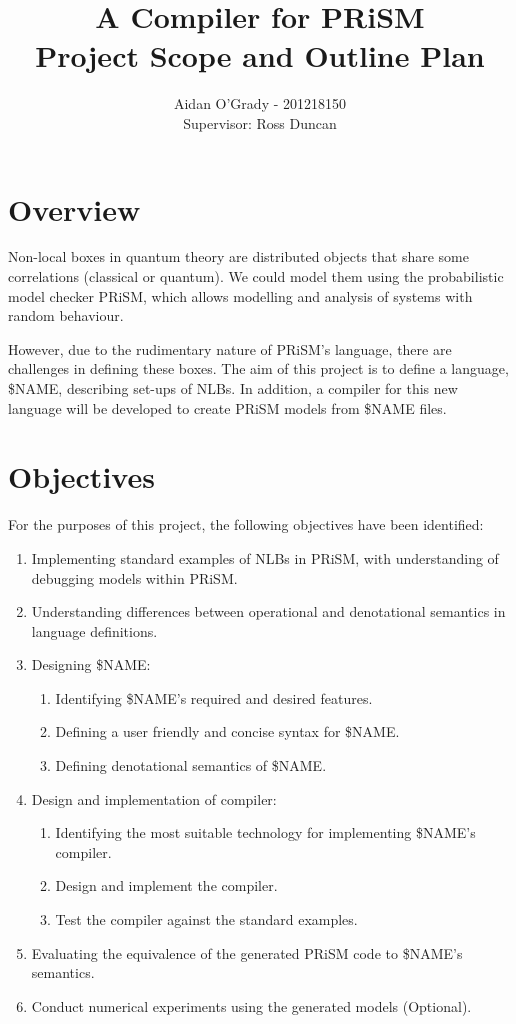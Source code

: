 \documentclass[11pt, a4paper]{article}
\begin{document}
\title{A Compiler for PRiSM \\
\large{Project Scope and Outline Plan}}
\author{Aidan O'Grady - 201218150\\Supervisor: Ross Duncan}
\date{}
\maketitle

\section{Overview} %
\label{sec:overview}
Non-local boxes in quantum theory are distributed objects that share some
correlations (classical or quantum). We could model them using the probabilistic
model checker PRiSM, which allows modelling and analysis of systems with random
behaviour.

However, due to the rudimentary nature of PRiSM's language, there are
challenges in defining these boxes. The aim of this project is to define a
language, \$NAME, describing set-ups of NLBs. In addition, a compiler for this
new language will be developed to create PRiSM models from \$NAME files.


\section{Objectives} %
\label{sec:objectives}
For the purposes of this project, the following objectives have been identified:
\begin{enumerate}
    \item Implementing standard examples of NLBs in PRiSM, with understanding of
    debugging models within PRiSM.
    \item Understanding differences between operational and denotational
    semantics in language definitions.
    \item Designing \$NAME:
    \begin{enumerate}
        \item Identifying \$NAME's required and desired features.
        \item Defining a user friendly and concise syntax for \$NAME.
        \item Defining denotational semantics of \$NAME.
    \end{enumerate}
    \item Design and implementation of compiler:
    \begin{enumerate}
        \item Identifying the most suitable technology for implementing \$NAME's
        compiler.
        \item Design and implement the compiler.
        \item Test the compiler against the standard examples.
    \end{enumerate}
    \item Evaluating the equivalence of the generated PRiSM code to \$NAME's
    semantics.
    \item Conduct numerical experiments using the generated models (Optional).
\end{enumerate}
\end{document}
